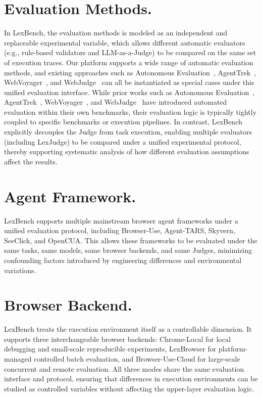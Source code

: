 \section{Evaluation Methods.} In LexBench, the evaluation methods is modeled as an independent and replaceable experimental variable, which allows different automatic evaluators (e.g., rule-based validators and LLM-as-a-Judge) to be compared on the same set of execution traces. Our platform supports a wide range of automatic evaluation methods, and existing approaches such as Autonomous Evaluation~\cite{pan2024autonomousevaluationrefinementdigital}, AgentTrek~\cite{xu2025agenttrekagenttrajectorysynthesis}, WebVoyager~\cite{he2024webvoyagerbuildingendtoendweb}, and WebJudge~\cite{online-mind2web} can all be instantiated as special cases under this unified evaluation interface. While prior works such as Autonomous Evaluation~\cite{pan2024autonomousevaluationrefinementdigital}, AgentTrek~\cite{xu2025agenttrekagenttrajectorysynthesis}, WebVoyager~\cite{he2024webvoyagerbuildingendtoendweb}, and WebJudge~\cite{online-mind2web} have introduced automated evaluation within their own benchmarks, their evaluation logic is typically tightly coupled to specific benchmarks or execution pipelines. In contrast, LexBench explicitly decouples the Judge from task execution, enabling multiple evaluators (including LexJudge) to be compared under a unified experimental protocol, thereby supporting systematic analysis of how different evaluation assumptions affect the results.


\section{Agent Framework.} LexBench supports multiple mainstream browser agent frameworks under a unified evaluation protocol, including Browser-Use, Agent-TARS, Skyvern, SeeClick, and OpenCUA. This allows these frameworks to be evaluated under the same tasks, same models, same browser backends, and same Judges, minimizing confounding factors introduced by engineering differences and environmental variations.

\section{Browser Backend.} LexBench treats the execution environment itself as a controllable dimension. It supports three interchangeable browser backends: Chrome-Local for local debugging and small-scale reproducible experiments, LexBrowser for platform-managed controlled batch evaluation, and Browser-Use-Cloud for large-scale concurrent and remote evaluation. All three modes share the same evaluation interface and protocol, ensuring that differences in execution environments can be studied as controlled variables without affecting the upper-layer evaluation logic.


